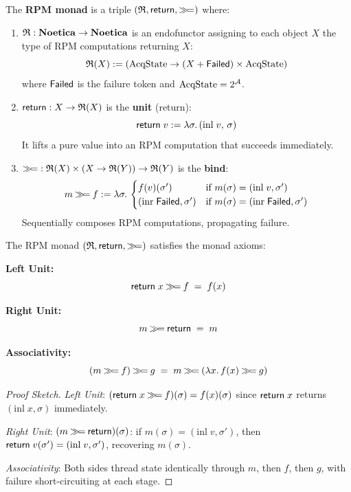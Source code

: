 \begin{definition}
\label{def:rpm-monad}
The \textbf{RPM monad} is a triple $(\mathfrak{R}, \mathsf{return}, \mathbin{\gg\!=})$ where:
\begin{enumerate}[label=(\roman*)]
    \item $\mathfrak{R} : \mathbf{Noetica} \to \mathbf{Noetica}$ is an endofunctor assigning to each object $X$
          the type of RPM computations returning $X$:
          \[
              \mathfrak{R}(X) := (\mathrm{AcqState} \to (X + \mathsf{Failed}) \times \mathrm{AcqState})
          \]
          where $\mathsf{Failed}$ is the failure token and $\mathrm{AcqState} = 2^{\mathcal{A}}$.

    \item $\mathsf{return} : X \to \mathfrak{R}(X)$ is the \textbf{unit} (return):
          \[
              \mathsf{return}\; v := \lambda \sigma.\, (\mathrm{inl}\; v,\, \sigma)
          \]
          It lifts a pure value into an RPM computation that succeeds immediately.

    \item $\mathbin{\gg\!=} : \mathfrak{R}(X) \times (X \to \mathfrak{R}(Y)) \to \mathfrak{R}(Y)$ is the \textbf{bind}:
          \[
              m \mathbin{\gg\!=} f := \lambda \sigma.\,
              \begin{cases}
                  f(v)(\sigma') & \text{if } m(\sigma) = (\mathrm{inl}\; v, \sigma') \\
                  (\mathrm{inr}\; \mathsf{Failed}, \sigma') & \text{if } m(\sigma) = (\mathrm{inr}\; \mathsf{Failed}, \sigma')
              \end{cases}
          \]
          Sequentially composes RPM computations, propagating failure.
\end{enumerate}
\end{definition}

\begin{theorem}
\label{thm:rpm-monad-laws}
The RPM monad $(\mathfrak{R}, \mathsf{return}, \mathbin{\gg\!=})$ satisfies the monad axioms:

\textbf{Left Unit:}
\[
    \mathsf{return}\; x \mathbin{\gg\!=} f \;=\; f(x)
\]

\textbf{Right Unit:}
\[
    m \mathbin{\gg\!=} \mathsf{return} \;=\; m
\]

\textbf{Associativity:}
\[
    (m \mathbin{\gg\!=} f) \mathbin{\gg\!=} g \;=\; m \mathbin{\gg\!=} (\lambda x.\, f(x) \mathbin{\gg\!=} g)
\]
\end{theorem}

\begin{proof}[Proof Sketch]
\textit{Left Unit}: $(\mathsf{return}\; x \mathbin{\gg\!=} f)(\sigma) = f(x)(\sigma)$ since
$\mathsf{return}\; x$ returns $(\mathrm{inl}\; x, \sigma)$ immediately.

\textit{Right Unit}: $(m \mathbin{\gg\!=} \mathsf{return})(\sigma)$: if $m(\sigma) = (\mathrm{inl}\; v, \sigma')$,
then $\mathsf{return}\; v(\sigma') = (\mathrm{inl}\; v, \sigma')$, recovering $m(\sigma)$.

\textit{Associativity}: Both sides thread state identically through $m$, then $f$,
then $g$, with failure short-circuiting at each stage.
\end{proof}


